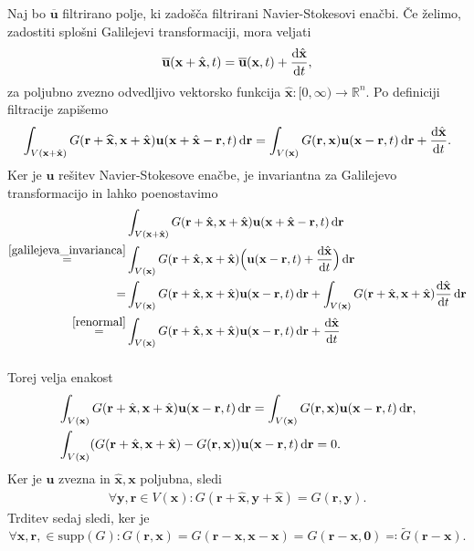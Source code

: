 \documentclass[mat2, tisk]{fmfdelo}
\newcommand{\R}{\mathbb R}
\newcommand{\bd}{\textbf}
\begin{document}
\begin{dokaz}
  Naj bo $\overline{\bd{u}}$ filtrirano polje, ki zadošča filtrirani Navier-Stokesovi enačbi.
  Če želimo, zadostiti splošni Galilejevi transformaciji, mora veljati 
  $$
  \overline{\bd{u}}(\bd{x} + \hat{\bd{x}}, t) = \overline{\bd{u}}(\bd{x}, t) + \frac{\dif \hat{\bd{x}}}{\dif t},
  $$
  za poljubno zvezno odvedljivo vektorsko funkcija $\hat{\bd{x}}: [0, \infty) \rightarrow \R^n$.
  Po definiciji filtracije zapišemo
  \begin{align}
  \label{renormal2}
  \int_{V(\bd{x} + \hat{\bd{x}})} G(\bd{r} + \widehat{\bd{x}}, \bd{x} + \hat{\bd{x}}) \bd{u}(\bd{x} + \hat{\bd{x}} - \bd{r}, t) \dif \bd{r} = \int_{V(\bd{x})} G(\bd{r}, \bd{x}) \bd{u}(\bd{x} - \bd{r}, t)\dif \bd{r} + \frac{\dif \hat{\bd{x}}}{\dif t} .
  \end{align}
  Ker je $\bd{u}$ rešitev Navier-Stokesove enačbe, je invariantna za Galilejevo transformacijo in lahko poenostavimo 
   \begin{align*}
     &\int_{V(\bd{x} + \hat{\bd{x}})} G(\bd{r} + \hat{\bd{x}}, \bd{x} + \hat{\bd{x}}) \bd{u}(\bd{x} + \hat{\bd{x}} - \bd{r}, t) \dif \bd{r} \\
     \stackrel{\ref{galilejeva_invarianca}}{=}& \int_{V(\bd{x})} G(\bd{r} + \hat{\bd{x}}, \bd{x} + \hat{\bd{x}}) \Big(\bd{u}(\bd{x} - \bd{r}, t) + \frac{\dif \hat{\bd{x}}}{\dif t} \Big)\dif \bd{r} \\
     =& \int_{V(\bd{x})} G(\bd{r} + \hat{\bd{x}}, \bd{x} + \hat{\bd{x}}) \bd{u}(\bd{x} - \bd{r}, t)\dif \bd{r}  + \int_{{V(\bd{x})}} G(\bd{r} + \hat{\bd{x}}, \bd{x} + \hat{\bd{x}}) \frac{\dif \hat{\bd{x}}}{\dif t} \dif \bd{r}\\
     \stackrel{\eqref{renormal}}{=}& \int_{V(\bd{x})} G(\bd{r} + \hat{\bd{x}}, \bd{x} + \hat{\bd{x}}) \bd{u}(\bd{x} - \bd{r}, t)\dif \bd{r}  + \frac{\dif \hat{\bd{x}}}{\dif t}\\[2mm]
   \end{align*}

  Torej velja enakost
  \begin{align*}
    &\int_{V(\bd{x})} G(\bd{r} + \hat{\bd{x}}, \bd{x} + \hat{\bd{x}}) \bd{u}(\bd{x} - \bd{r}, t)\dif \bd{r} = \int_{V(\bd{x})} G(\bd{r}, \bd{x}) \bd{u}(\bd{x} - \bd{r}, t)\dif \bd{r},\\
    & \int_{V(\bd{x})} (G(\bd{r} + \hat{\bd{x}}, \bd{x} + \hat{\bd{x}}) - G(\bd{r}, \bd{x})) \bd{u}(\bd{x} - \bd{r}, t)\dif \bd{r} = 0.
  \end{align*}
  Ker je $\bd{u}$ zvezna in $\hat{\bd{x}}, \bd{x}$ poljubna, sledi
  \begin{align*}
  \forall \bd{y}, \bd{r} \in V(\bd{x}): G(\bd{r} + \hat{\bd{x}}, \bd{y} + \hat{\bd{x}}) = G(\bd{r}, \bd{y}).
  \end{align*}
  Trditev sedaj sledi, ker je 
  $$
  \forall \bd{x}, \bd{r}, \in \text{supp}(G): G(\bd{r}, \bd{x}) = G(\bd{r} - \bd{x}, \bd{x} - \bd{x}) = G(\bd{r} - \bd{x}, \bd{0}) \eqqcolon \tilde{G}(\bd{r} - \bd{x}).
  $$
\end{dokaz}
\end{document}
